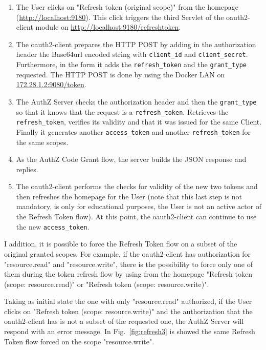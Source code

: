\documentclass[a4paper,12pt]{article}
\def\myfig#1{Fig.~#1\xspace}
\begin{document}
\begin{enumerate}
    \item The User clicks on "Refresh token (original scope)" from the homepage (\url{http://localhost:9180}). This click triggers the third Servlet of the oauth2-client module on \url{http://localhost:9180/refreshtoken}.
    \item The oauth2-client prepares the HTTP POST by adding in the authorization header the Base64url encoded string with \texttt{client\_id} and \texttt{client\_secret}. Furthermore, in the form it adds the \texttt{refresh\_token} and the \texttt{grant\_type} requested. The HTTP POST is done by using the Docker LAN on \url{172.28.1.2:9080/token}.
    \item The AuthZ Server checks the authorization header and then the \texttt{grant\_type} so that it knows that the request is a \texttt{refresh\_token}. Retrieves the \texttt{refresh\_token}, verifies its validity and that it was issued for the same Client. Finally it generates another \texttt{access\_token} and another \texttt{refresh\_token} for the same scopes.
    \item As the AuthZ Code Grant flow, the server builds the JSON response and replies.
    \item The oauth2-client performs the checks for validity of the new two tokens and then refreshes the homepage for the User (note that this last step is not mandatory, is only for educational purposes, the User is not an active actor of the Refresh Token flow). At this point, the oauth2-client can continue to use the new \texttt{access\_token}.
\end{enumerate}

I addition, it is possible to force the Refresh Token flow on a subset of the original granted scopes. For example, if the oauth2-client has authorization for "resource.read" and "resource.write", there is the possibility to force only one of them during the token refresh flow by using from the homepage "Refresh token (scope: resource.read)" or "Refresh token (scope: resource.write)". 

Taking as initial state the one with only "resource.read" authorized, if the User clicks on "Refresh token (scope: resource.write)" and the authorization that the oauth2-client has is not a subset of the requested one, the AuthZ Server will respond with an error message. In \myfig{\ref{fig:refresh3}} is showed the same Refresh Token flow forced on the scope "resource.write". 
\end{document}
